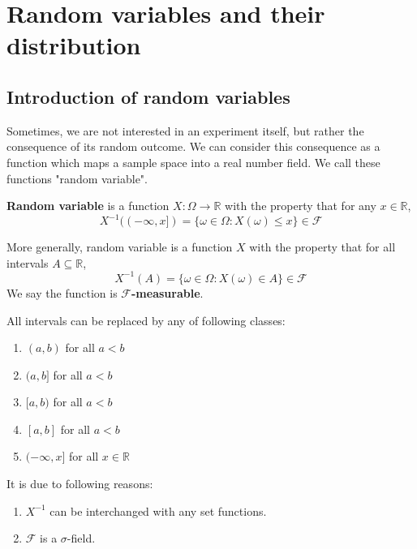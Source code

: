 \documentclass{huhtakm-template-book}
\begin{document}
\chapter{Random variables and their distribution}
\section{Introduction of random variables}
    Sometimes, we are not interested in an experiment itself, but rather the consequence of its random outcome. We can consider this consequence as a function which maps a sample space into a real number field. We call these functions "random variable".
    \begin{defn}
        \textbf{Random variable} is a function $X:\Omega\to\mathbb{R}$ with the property that for any $x\in\mathbb{R}$,
        \begin{equation*}
            X^{-1}((-\infty,x])=\{\omega\in\Omega:X(\omega)\leq x\}\in\mathcal{F}
        \end{equation*}
    \end{defn}
    \begin{rem}
        More generally, random variable is a function $X$ with the property that for all intervals $A\subseteq\mathbb{R}$, 
        \begin{equation*}
            X^{-1}(A)=\{\omega\in\Omega: X(\omega)\in A\}\in\mathcal{F}
        \end{equation*}
        We say the function is \textbf{$\mathcal{F}$-measurable}.
    \end{rem}
    \begin{rem}
        All intervals can be replaced by any of following classes:
        \begin{enumerate}
            \item $(a,b)$ for all $a<b$
            \item $(a,b]$ for all $a<b$
            \item $[a,b)$ for all $a<b$
            \item $[a,b]$ for all $a<b$
            \item $(-\infty,x]$ for all $x\in\mathbb{R}$
        \end{enumerate}
        It is due to following reasons:
        \begin{enumerate}
            \item $X^{-1}$ can be interchanged with any set functions.
            \item $\mathcal{F}$ is a $\sigma$-field.
        \end{enumerate}
    \end{rem}
\end{document}
